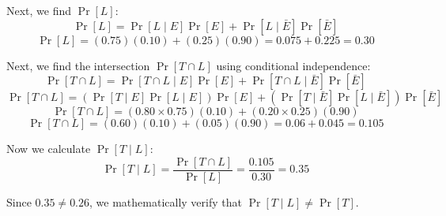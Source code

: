 \documentclass[11pt]{article}
\begin{document}
\begin{enumerate}[label=\textbf{(\alph*)}]
    Next, we find $\Pr[L]$:
    $$ \Pr[L] = \Pr[L \mid E]\Pr[E] + \Pr[L \mid \bar{E}]\Pr[\bar{E}] $$
    $$ \Pr[L] = (0.75)(0.10) + (0.25)(0.90) = 0.075 + 0.225 = 0.30 $$
    
    Next, we find the intersection $\Pr[T \cap L]$ using conditional independence:
    $$ \Pr[T \cap L] = \Pr[T \cap L \mid E]\Pr[E] + \Pr[T \cap L \mid \bar{E}]\Pr[\bar{E}] $$
    $$ \Pr[T \cap L] = (\Pr[T \mid E]\Pr[L \mid E])\Pr[E] + (\Pr[T \mid \bar{E}]\Pr[L \mid \bar{E}])\Pr[\bar{E}] $$
    $$ \Pr[T \cap L] = (0.80 \times 0.75)(0.10) + (0.20 \times 0.25)(0.90) $$
    $$ \Pr[T \cap L] = (0.60)(0.10) + (0.05)(0.90) = 0.06 + 0.045 = 0.105 $$
    
    Now we calculate $\Pr[T \mid L]$:
    $$ \Pr[T \mid L] = \frac{\Pr[T \cap L]}{\Pr[L]} = \frac{0.105}{0.30} = 0.35 $$
    
    Since $0.35 \neq 0.26$, we mathematically verify that $\Pr[T \mid L] \neq \Pr[T]$.
\end{enumerate}
\end{document}

